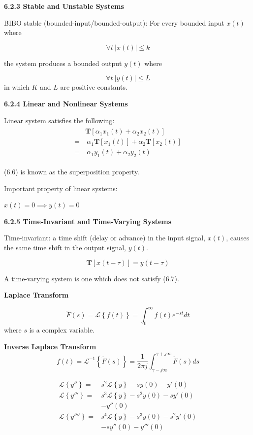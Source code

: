 \documentclass[landscape,a4paper]{extarticle}
\newcommand{\T}{\textbf{T}}
\newcommand{\lap}[1]{\mathcal{L}\left\{#1\right\}}
\newcommand{\invlap}[1]{\mathcal{L}^{-1}\left\{#1\right\}}
\begin{document}
\begin{multicols*}{5}
    \textbf{6.2.3 Stable and Unstable Systems}

    BIBO stable (bounded-input/bounded-output): For every bounded input $x(t)$ where

    \[
        \forall t\ |x(t)| \leq k \tag{6.2}
    \]

    the system produces a bounded output $y(t)$ where 

    \[
        \forall t\ |y(t)| \leq L \tag{6.3}
    \]
    in which $K$ and $L$ are positive constants.

    \textbf{6.2.4 Linear and Nonlinear Systems}

    Linear system satisfies the following:
    \begin{align}
        \begin{split}
            &\T[\alpha_1x_1(t) + \alpha_2x_2(t)]\\
            =&\ \alpha_1\T[x_1(t)] + \alpha_2\T[x_2(t)]\\
            =&\ \alpha_1y_1(t) + \alpha_2y_2(t)
        \end{split} \tag{6.6}
    \end{align}

    (6.6) is known as the superposition property.

    Important property of linear systems: 
    
    $x(t) = 0 \implies y(t) = 0$

    \textbf{6.2.5 Time-Invariant and Time-Varying Systems}

    Time-invariant: a time shift (delay or advance) in the input signal, $x(t)$, causes the same time shift in the output signal, $y(t)$.

    \[
        \T[x(t-\tau)] = y(t-\tau) \tag{6.7}
    \]

    A time-varying system is one which does not satisfy (6.7).

    \textbf{Laplace Transform}

    \[
        \tilde{F}(s) = \lap{f(t)} = \int_{0}^{\infty}f(t)e^{-st} dt \tag{6.8}
    \]
    where $s$ is a complex variable.

    \textbf{Inverse Laplace Transform}
    \[
        f(t) = \invlap{\tilde{F}(s)} = \frac{1}{2\pi j} \int_{\gamma - j \infty}^{\gamma + j \infty}\tilde{F}(s)ds \tag{6.9}
    \]
    
    \begin{align*}
        \lap{y''} = {}&s^2 \lap{y} - sy(0) - y'(0)\\
        \lap{y'''} = {}&s^3 \lap{y} - s^2 y(0) - s y'(0)\\
                    &- y''(0)\\
        \lap{y''''} = {}&s^4\lap{y} - s^3y(0) - s^2 y'(0)\\ 
                    &- s y''(0) - y'''(0)
    \end{align*}


\end{multicols*}
\end{document}
